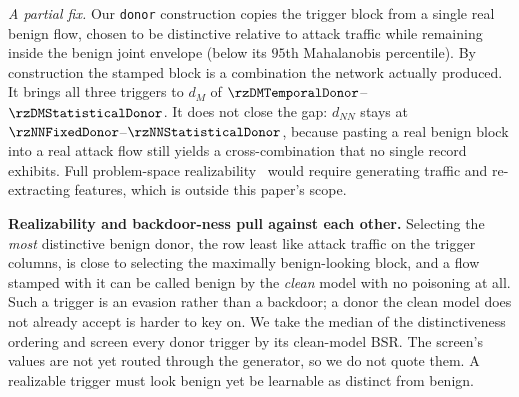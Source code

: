 \emph{A partial fix.} Our \texttt{donor} construction copies the trigger block
from a single real benign flow, chosen to be distinctive relative to attack
traffic while remaining inside the benign joint envelope (below its $95$th
Mahalanobis percentile). By construction the stamped block is a combination the
network actually produced. It brings all three triggers to
$d_M$ of $\rzDMTemporalDonor$--$\rzDMStatisticalDonor$. It does not close the
gap: $d_{NN}$ stays at $\rzNNFixedDonor$--$\rzNNStatisticalDonor$, because
pasting a real benign block into a real attack flow still yields a
cross-combination that no single record exhibits. Full problem-space
realizability~\cite{pierazzi2020problem} would require generating traffic and
re-extracting features, which is outside this paper's scope.

\textbf{Realizability and backdoor-ness pull against each other.} Selecting the
\emph{most} distinctive benign donor, the row least like attack traffic on the
trigger columns, is close to selecting the maximally benign-looking block, and a
flow stamped with it can be called benign by the \emph{clean} model with no
poisoning at all. Such a trigger is an evasion rather than a backdoor; a donor the
clean model does not already accept is harder to key on. We take the median of the
distinctiveness ordering and screen every donor trigger by its clean-model BSR. The screen's values are
not yet routed through the generator, so we do not quote them. \PENDING
A realizable trigger must look benign yet be learnable as distinct from benign.

